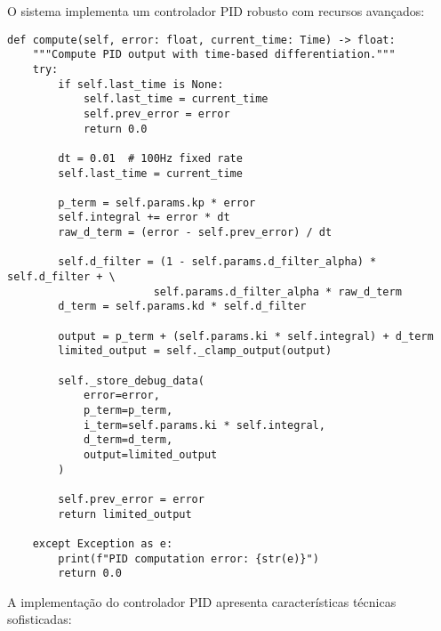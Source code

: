 O sistema implementa um controlador PID robusto com recursos avançados:

\begin{verbatim}
def compute(self, error: float, current_time: Time) -> float:
    """Compute PID output with time-based differentiation."""
    try:
        if self.last_time is None:
            self.last_time = current_time
            self.prev_error = error
            return 0.0

        dt = 0.01  # 100Hz fixed rate
        self.last_time = current_time

        p_term = self.params.kp * error
        self.integral += error * dt
        raw_d_term = (error - self.prev_error) / dt

        self.d_filter = (1 - self.params.d_filter_alpha) * self.d_filter + \
                       self.params.d_filter_alpha * raw_d_term
        d_term = self.params.kd * self.d_filter

        output = p_term + (self.params.ki * self.integral) + d_term
        limited_output = self._clamp_output(output)

        self._store_debug_data(
            error=error,
            p_term=p_term,
            i_term=self.params.ki * self.integral,
            d_term=d_term,
            output=limited_output
        )
        
        self.prev_error = error
        return limited_output

    except Exception as e:
        print(f"PID computation error: {str(e)}")
        return 0.0
\end{verbatim}

A implementação do controlador PID apresenta características técnicas
sofisticadas:

